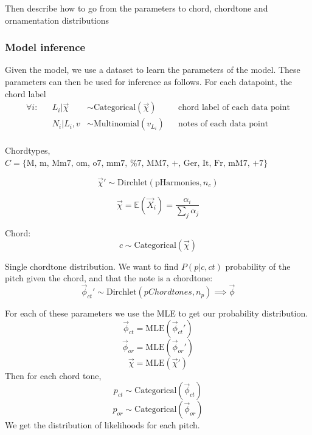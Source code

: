 \documentclass[12pt,a4paper,twoside,openright]{report}
\theoremstyle{definition}
\begin{document}
\par
Then describe how to go from the parameters to chord, chordtone and ornamentation distributions
\par

\subsubsection{Model inference}
Given the model, we use a dataset to learn the parameters of the model. These parameters can then be used for inference as follows.
For each datapoint, the chord label 
\begin{equation}
\begin{align*} 
  \forall i:  && L_i | \vec{\chi} &\sim \text{Categorical}(\vec{\chi}) && \text{chord label of each data point} \\
              && N_i | L_i, v &\sim \text{Multinomial}(v_{L_i})  && \text{notes of each data point} \\
\end{align*}
\label{eq:chordlabeldp}
\end{equation}

\par
Chordtypes, $C = \{\text{M,~m, Mm7, om, o7, mm7, \%7, MM7, +, Ger, It, Fr, mM7, +7}\}$

\[\vec{\chi}' \sim \text{Dirchlet} (\text{pHarmonies}, n_c) \]

\[\vec{\chi} = \mathbb{E} (\vec{X}_i) = \frac{\alpha_i}{\sum\limits_j \alpha_j} \]

Chord: \[c \sim \text{Categorical}(\vec{\chi})\]

Single chordtone distribution. We want to find $P(p|c, ct)$ probability of the pitch given the chord, and that the note is a chordtone:
\[\vec{\phi}_{ct}' \sim \text{Dirchlet}(pChordtones, n_p) \implies \vec{\phi}\]

For each of these parameters we use the MLE to get our probability distribution. 
\[\vec{\phi}_{ct} = \text{MLE} (\vec{\phi}_{ct}')\]
\[\vec{\phi}_{or} = \text{MLE} (\vec{\phi}_{or}')\]
\[\vec{\chi}= \text{MLE} (\vec{\chi}') \]
Then for each chord tone,
\[p_{ct} \sim \text{Categorical}(\vec{\phi}_{ct})\]
\[p_{or} \sim \text{Categorical}(\vec{\phi}_{or})\]
We get the distribution of likelihoods for each pitch.

%
\end{document}
